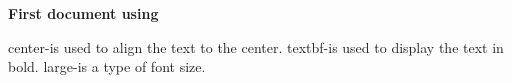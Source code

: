 \documentclass[a4paper]{article}
\begin{document}
\begin{center}
\begin{large}
\textbf{First document using \LaTex}
\end{large}
\end{center}
center-is used to align the text to the center.
textbf-is used to display the text in bold.
large-is a type of font size.
\end{document}

